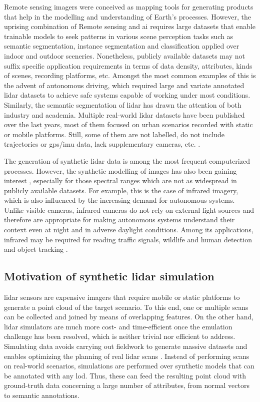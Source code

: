 Remote sensing imagers were conceived as mapping tools for generating products that help in the modelling and understanding of Earth's processes. However, the uprising combination of Remote sensing and \acrshort{ai} requires large datasets that enable trainable models to seek patterns in various scene perception tasks such as semantic segmentation, instance segmentation and classification applied over indoor and outdoor sceneries. Nonetheless, publicly available datasets may not suffix specific application requirements in terms of data density, attributes, kinds of scenes, recording platforms, etc. Amongst the most common examples of this is the advent of autonomous driving, which required large and variate annotated \acrshort{lidar} datasets to achieve safe systems capable of working under most conditions. Similarly, the semantic segmentation of \acrshort{lidar} has drawn the attention of both industry and academia. Multiple real-world \acrshort{lidar} datasets have been published over the last years, most of them focused on urban scenarios recorded with static or mobile platforms. Still, some of them are not labelled, do not include trajectories or \acrshort{gps}/\acrshort{imu} data, lack supplementary cameras, etc. \cite{cai_survey_2022}. 

The generation of synthetic \acrshort{lidar} data is among the most frequent computerized processes. However, the synthetic modelling of images has also been gaining interest \cite{yi_cycle_2023, ozkanoglu_infragan_2022}, especially for those spectral ranges which are not as widespread in publicly available datasets. For example, this is the case of infrared imagery, which is also influenced by the increasing demand for autonomous systems. Unlike visible cameras, infrared cameras do not rely on external light sources and therefore are appropriate for making autonomous systems understand their context even at night and in adverse daylight conditions. Among its applications, infrared may be required for reading traffic signals, wildlife and human detection and object tracking \cite{vollmer_infrared_2017}.  

\subsection{Motivation of synthetic \acrshort{lidar} simulation}

\acrshort{lidar} sensors are expensive imagers that require mobile or static platforms to generate a point cloud of the target scenario. To this end, one or multiple scans can be collected and joined by means of overlapping features. On the other hand, \acrshort{lidar} simulators are much more cost- and time-efficient once the emulation challenge has been resolved, which is neither trivial nor efficient to address. Simulating data avoids carrying out fieldwork to generate massive datasets and enables optimizing the planning of real \acrshort{lidar} scans \cite{mohan_robust_2019, li_3d_2022}. Instead of performing scans on real-world scenarios, simulations are performed over synthetic models that can be annotated with any \acrshort{lod}. Thus, these can feed the resulting point cloud with ground-truth data concerning a large number of attributes, from normal vectors to semantic annotations. 

